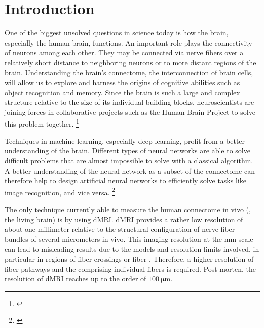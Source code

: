 \newpage\null\thispagestyle{empty}\newpage
\clearpage{\thispagestyle{empty}\cleardoublepage}
\cleardoublepage
% 
% 
% 
\setcounter{chapter}{0}
\chapter{Introduction}
\label{sec:intro}
% 
One of the biggest unsolved questions in science today is how the brain, especially the human brain, functions.
An important role plays the connectivity of neurons among each other.
They may be connected via nerve fibers over a relatively short distance to neighboring neurons or to more distant regions of the brain.
Understanding the brain's connectome, the interconnection of brain cells, will allow us to explore and harness the origins of cognitive abilities such as object recognition and memory.
Since the brain is such a large and complex structure relative to the size of its individual building blocks, neuroscientists are joining forces in collaborative projects such as the Human Brain Project to solve this problem together.
\footnote{\cite{Markram2006, Shen2012, Amunts2013, Amunts2016}}
\par
% 
Techniques in machine learning, especially deep learning, profit from a better understanding of the brain.
Different types of neural networks are able to solve difficult problems that are almost impossible to solve with a classical algorithm.
A better understanding of the neural network as a subset of the connectome can therefore help to design artificial neural networks to efficiently solve tasks like image recognition, and vice versa.
\footnote{\cite{murphy2013machine, Goodfellow-et-al-2016}}
\par
% 
The only technique currently able to measure the human connectome in vivo (\ie{}, the living brain) is by using \ac{dMRI}.
\ac{dMRI} provides a rather low resolution of about one millimeter relative to the structural configuration of nerve fiber bundles of several micrometers in vivo.
This imaging resolution at the \si{\milli\meter}-scale can lead to misleading results due to the models and resolution limits involved, in particular in regions of fiber crossings or fiber . %
Therefore, a higher resolution of fiber pathways and the comprising individual fibers is required.
Post morten, the resolution of \ac{dMRI} reaches up to the order of $\SI{100}{\micro\meter}$.
